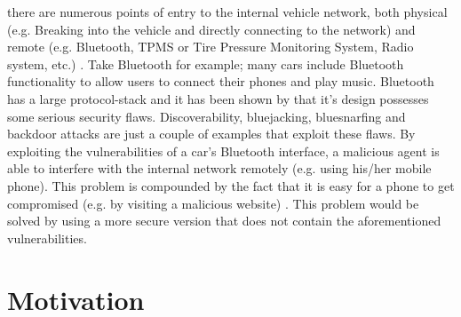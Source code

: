 there are numerous points of entry to the internal vehicle network, both physical (e.g. Breaking into the vehicle and directly connecting to the network) and remote (e.g. Bluetooth, TPMS or Tire Pressure Monitoring System, Radio system, etc.) \cite{MillerA}. Take Bluetooth for example; many cars include Bluetooth functionality to allow users to connect their phones and play music. Bluetooth has a large protocol-stack and it has been shown by \cite{Bluetooth} that it's design possesses some serious security flaws. Discoverability, bluejacking, bluesnarfing and backdoor attacks are just a couple of examples that exploit these flaws. By exploiting the vulnerabilities of a car's Bluetooth interface, a malicious agent is able to interfere with the internal network remotely (e.g. using his/her mobile phone). This problem is compounded by the fact that it is easy for a phone to get compromised (e.g. by visiting a malicious website) \cite{Yadav16}. This problem would be solved by using a more secure version that does not contain the aforementioned vulnerabilities.



\section{Motivation}
\label{sec:motivation}

